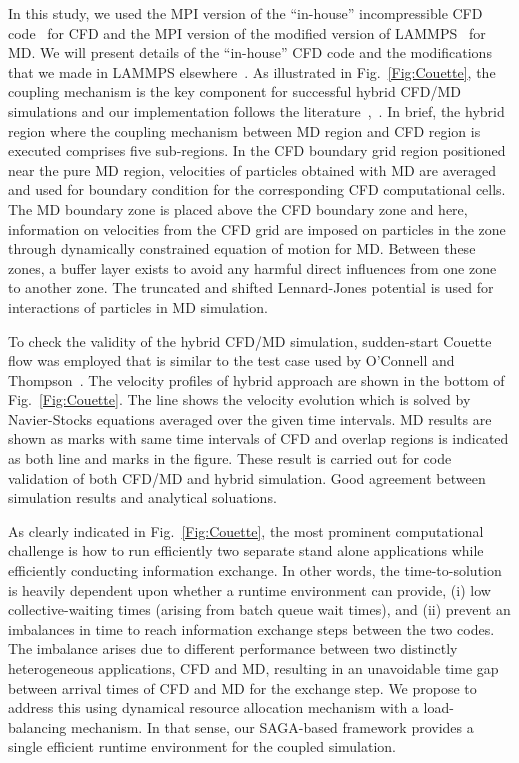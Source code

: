 \documentclass[conference,final]{IEEEtran}
\begin{document}
In this study, we used the MPI version of the ``in-house''
incompressible CFD code~\cite{Lee} for CFD and the MPI version of the
modified version of LAMMPS~\cite{LAMMPS} for MD. We will present
details of the ``in-house'' CFD code and the modifications that we
made in LAMMPS elsewhere~\cite{jocs_in_prep}. As illustrated in
Fig.~\ref{Fig:Couette}, the coupling mechanism is the key component
for successful hybrid CFD/MD simulations and our implementation
follows the literature~\cite{Nie},~\cite{Yen}. In brief, the hybrid
region where the coupling mechanism between MD region and CFD region
is executed comprises five sub-regions. In the CFD boundary grid
region positioned near the pure MD region, velocities of particles
obtained with MD are averaged and used for boundary condition for the
corresponding CFD computational cells. The MD boundary zone is placed
above the CFD boundary zone and here, information on velocities from
the CFD grid are imposed on particles in the zone through dynamically
constrained equation of motion for MD. Between these zones, a buffer
layer exists to avoid any harmful direct influences from one zone to
another zone. The truncated and shifted Lennard-Jones potential is
used for interactions of particles in MD simulation.


To check the validity of the hybrid CFD/MD simulation, sudden-start
Couette flow was employed that is similar to the test case used by
O'Connell and Thompson~\cite{Thompson}.  The velocity profiles of
hybrid approach are shown in the bottom of Fig.~\ref{Fig:Couette}. The
line shows the velocity evolution which is solved by Navier-Stocks
equations averaged over the given time intervals. MD results are shown
as marks with same time intervals of CFD and overlap regions is
indicated as both line and marks in the figure. These result is
carried out for code validation of both CFD/MD and hybrid
simulation. Good agreement between simulation results and analytical
soluations.

As clearly indicated in Fig.~\ref{Fig:Couette}, the most prominent
computational challenge is how to run efficiently two separate stand
alone applications while efficiently conducting information exchange.
In other words, the time-to-solution is heavily dependent upon whether
a runtime environment can provide, (i) low collective-waiting times
(arising from batch queue wait times), and (ii) prevent an imbalances
in time to reach information exchange steps between the two codes. The
imbalance arises due to different performance between two distinctly
heterogeneous applications, CFD and MD, resulting in an unavoidable
time gap between arrival times of CFD and MD for the exchange step. We
propose to address this using dynamical resource allocation mechanism
with a load-balancing mechanism. In that sense, our SAGA-based
framework provides a single efficient runtime environment for the
coupled simulation.
\end{document}
